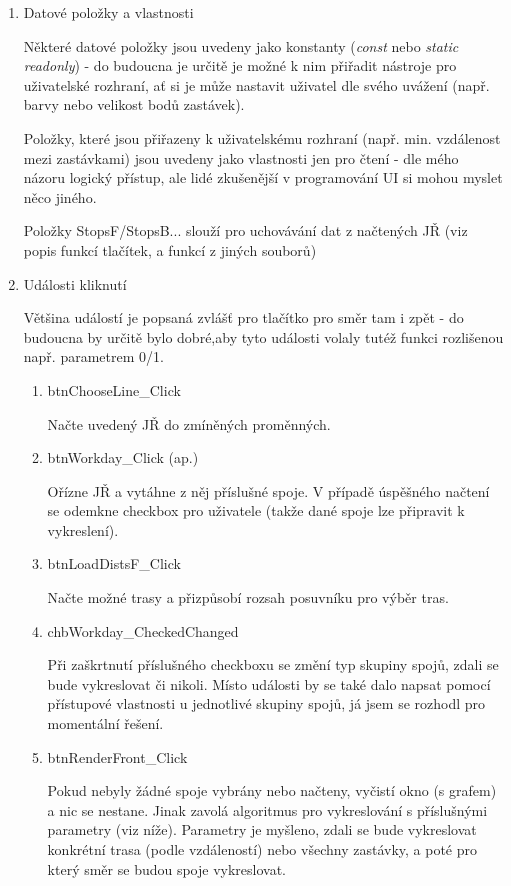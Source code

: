 \documentclass[14pt]{article}
\begin{document}
\begin{enumerate}

\item Datové položky a vlastnosti

Některé datové položky jsou uvedeny jako konstanty (\textit{const} nebo \textit{static readonly}) - do budoucna je určitě je možné k nim přiřadit nástroje pro uživatelské rozhraní, ať si je může nastavit uživatel dle svého uvážení (např. barvy nebo velikost bodů zastávek).

Položky, které jsou přiřazeny k uživatelskému rozhraní (např. min. vzdálenost mezi zastávkami) jsou uvedeny jako vlastnosti jen pro čtení - dle mého názoru logický přístup, ale lidé zkušenější v programování UI si mohou myslet něco jiného.

Položky StopsF/StopsB... slouží pro uchovávání dat z načtených JŘ (viz popis funkcí tlačítek, a funkcí z jiných souborů)

\item Události kliknutí

Většina událostí je popsaná zvlášť pro tlačítko pro směr tam i zpět - do budoucna by určitě bylo dobré,aby tyto události volaly tutéž funkci rozlišenou např. parametrem 0/1.
\begin{enumerate}

\item btnChooseLine\_Click

Načte uvedený JŘ do zmíněných proměnných.

\item btnWorkday\_Click (ap.)

Ořízne JŘ a vytáhne z něj příslušné spoje. V případě úspěšného načtení se odemkne checkbox pro uživatele (takže dané spoje lze připravit k vykreslení).

\item btnLoadDistsF\_Click

Načte možné trasy a přizpůsobí rozsah posuvníku pro výběr tras.

\item chbWorkday\_CheckedChanged

Při zaškrtnutí příslušného checkboxu se změní typ skupiny spojů, zdali se bude vykreslovat či nikoli. Místo události by se také dalo napsat pomocí přístupové vlastnosti u jednotlivé skupiny spojů, já jsem se rozhodl pro momentální řešení.

\item btnRenderFront\_Click

Pokud nebyly žádné spoje vybrány nebo načteny, vyčistí okno (s grafem) a nic se nestane. Jinak zavolá algoritmus pro vykreslování s příslušnými parametry (viz níže). Parametry je myšleno, zdali se bude vykreslovat konkrétní trasa (podle vzdáleností) nebo všechny zastávky, a poté pro který směr se budou spoje vykreslovat.


\end{enumerate}
\end{enumerate}
\end{document}
